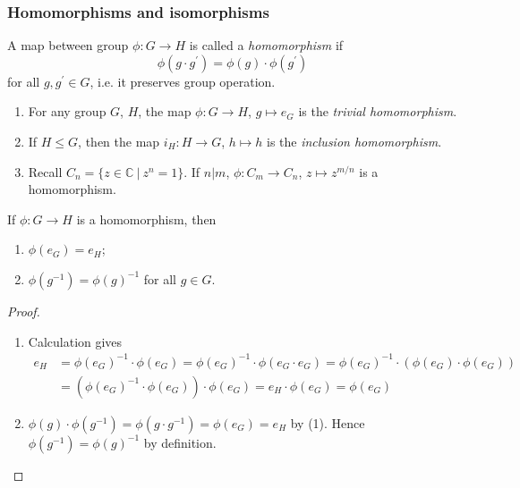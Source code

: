 \documentclass[10pt, a4paper, twoside]{report}
\begin{document}
\subsubsection{Homomorphisms and isomorphisms}
\begin{definition}
    A map between group \(\phi:G\to H\) is called a \emph{homomorphism} if \[\phi(g\cdot g^\prime)=\phi(g)\cdot\phi(g^\prime)\] for all \(g,g^\prime\in G\), i.e. it preserves group operation.
\end{definition}
\begin{example} \item[] 
    \begin{enumerate}
        \item For any group \(G\), \(H\), the map \(\phi:G\to H\), \(g\mapsto e_G\) is the \emph{trivial homomorphism}.
        \item If \(H\leq G\), then the map \(i_H:H\to G\), \(h\mapsto h\) is the \emph{inclusion homomorphism}.
        \item Recall \(C_n=\{z\in\mathbb{C}\:|\:z^n=1\}\). If \(n|m\), \(\phi:C_m\to C_n\), \(z\mapsto z^{m/n}\) is a homomorphism.
    \end{enumerate}
\end{example}
\begin{lemma}
    If \(\phi:G\to H\) is a homomorphism, then 
    \begin{enumerate}
        \item \(\phi(e_G)=e_H\);
        \item \(\phi(g^{-1})=\phi(g)^{-1}\) for all \(g\in G\).
    \end{enumerate}
\end{lemma}
\begin{proof} \item[] 
    \begin{enumerate}
        \item Calculation gives 
        \begin{align*}
            e_H&=\phi(e_G)^{-1}\cdot\phi(e_G)=\phi(e_G)^{-1}\cdot\phi(e_G\cdot e_G)=\phi(e_G)^{-1}\cdot(\phi(e_G)\cdot\phi(e_G)) \\
            &=(\phi(e_G)^{-1}\cdot\phi(e_G))\cdot\phi(e_G) =e_H\cdot\phi(e_G)=\phi(e_G)
        \end{align*}
        \item \(\phi(g)\cdot\phi(g^{-1})=\phi(g\cdot g^{-1})=\phi(e_G)=e_H\) by (1). Hence \(\phi(g^{-1})=\phi(g)^{-1}\) by definition.
    \end{enumerate}
\end{proof}
\end{document}
